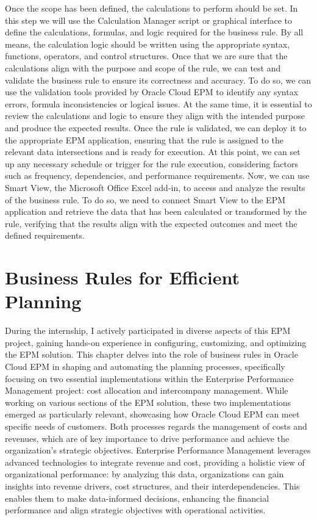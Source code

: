 \documentclass[12pt,a4paper,openright,twoside]{book}
\begin{document}
Once the scope has been defined, the calculations to perform should be set.
%
In this step we will use the Calculation Manager script or graphical interface to define the calculations, formulas, and logic required for the business rule. 
%
By all means, the calculation logic should be written using the appropriate syntax, functions, operators, and control structures.
%
Once that we are sure that the calculations align with the purpose and scope of the rule, we can test and validate the business rule to ensure its correctness and accuracy. 
%
To do so, we can use the validation tools provided by Oracle Cloud EPM to identify any syntax errors, formula inconsistencies or logical issues. 
%
At the same time, it is essential to review the calculations and logic to ensure they align with the intended purpose and produce the expected results.
%
Once the rule is validated, we can deploy it to the appropriate EPM application, ensuring that the rule is assigned to the relevant data intersections and is ready for execution. 
%
At this point, we can set up any necessary schedule or trigger for the rule execution, considering factors such as frequency, dependencies, and performance requirements.
%
Now, we can use Smart View, the Microsoft Office Excel add-in, to access and analyze the results of the business rule.
%
To do so, we need to connect Smart View to the EPM application and retrieve the data that has been calculated or transformed by the rule, verifying that the results align with the expected outcomes and meet the defined requirements.

\chapter{Business Rules for Efficient Planning}
\label{chap:cmyactivity}

During the internship, I actively participated in diverse aspects of this EPM project, gaining hands-on experience in configuring, customizing, and optimizing the EPM solution. 
%
This chapter delves into the role of business rules in Oracle Cloud EPM in shaping and automating the planning processes, specifically focusing on two essential implementations within the Enterprise Performance Management project: cost allocation and intercompany management. 
%
While working on various sections of the EPM solution, these two implementations emerged as particularly relevant, showcasing how Oracle Cloud EPM can meet specific needs of customers.
%
Both processes regards the management of costs and revenues, which are of key importance to drive performance and achieve the organization's strategic objectives.
%
Enterprise Performance Management leverages advanced technologies to integrate revenue and cost, providing a holistic view of organizational performance: by analyzing this data, organizations can gain insights into revenue drivers, cost structures, and their interdependencies. 
%
This enables them to make data-informed decisions, enhancing the financial performance and align strategic objectives with operational activities.
\end{document}
